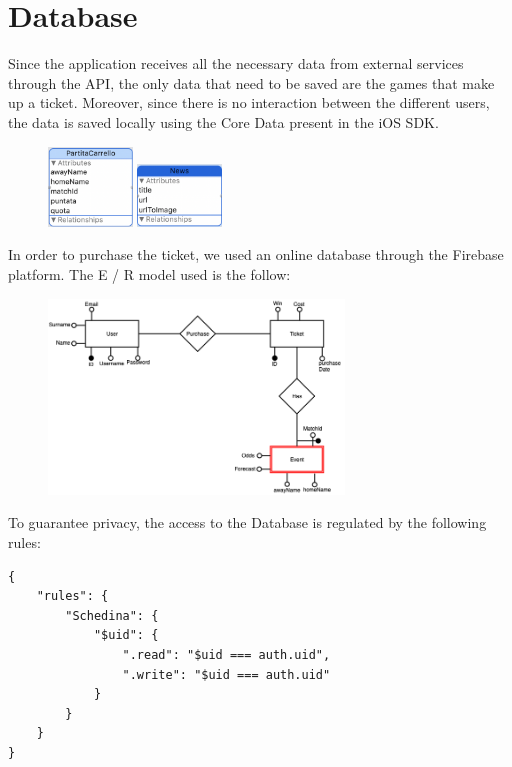 \documentclass[numbers=noenddot, 12pt, a4paper, oneside]{scrbook}
\begin{document}
\section{Database}
Since the application receives all the necessary data from external services through the API, the only data that need to be saved are the games that make up a ticket. Moreover, since there is no interaction between the different users, the data is saved locally using the Core Data present in the iOS SDK.
\begin{figure}[H]
	\centering
	\includegraphics[width=0.2\textwidth]{images/DatiSchedina}
	\includegraphics[width=0.2\textwidth]{images/DatiNews}
\end{figure}
In order to purchase the ticket, we used an online database through the Firebase platform. The E / R model used is the follow:
\begin{figure}[H]
	\centering
	\includegraphics[width=0.7\textwidth]{images/ER.png}
\end{figure}
\newpage
To guarantee privacy, the access to the Database is regulated by the following rules:
\begin{lstlisting}[style=CStyle]
{
	"rules": {
		"Schedina": {
			"$uid": {
				".read": "$uid === auth.uid",
				".write": "$uid === auth.uid"
			}
		}
	}
}
\end{lstlisting}
\end{document}
